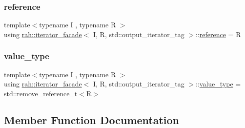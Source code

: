 \subsubsection{\texorpdfstring{reference}{reference}}
{\footnotesize\ttfamily template$<$typename I , typename R $>$ \\
using \mbox{\hyperlink{structrah_1_1iterator__facade}{rah\+::iterator\+\_\+facade}}$<$ I, R, std\+::output\+\_\+iterator\+\_\+tag $>$\+::\mbox{\hyperlink{structrah_1_1iterator__facade_3_01_i_00_01_r_00_01std_1_1output__iterator__tag_01_4_aa6a95e1b55444933973b7fe4a63512e2}{reference}} =  R}

\mbox{\label{structrah_1_1iterator__facade_3_01_i_00_01_r_00_01std_1_1output__iterator__tag_01_4_aeafcf4359545a589d72a23f8500e9b74}} 
\subsubsection{\texorpdfstring{value\_type}{value\_type}}
{\footnotesize\ttfamily template$<$typename I , typename R $>$ \\
using \mbox{\hyperlink{structrah_1_1iterator__facade}{rah\+::iterator\+\_\+facade}}$<$ I, R, std\+::output\+\_\+iterator\+\_\+tag $>$\+::\mbox{\hyperlink{structrah_1_1iterator__facade_3_01_i_00_01_r_00_01std_1_1output__iterator__tag_01_4_aeafcf4359545a589d72a23f8500e9b74}{value\+\_\+type}} =  std\+::remove\+\_\+reference\+\_\+t$<$R$>$}



\subsection{Member Function Documentation}
\mbox{\label{structrah_1_1iterator__facade_3_01_i_00_01_r_00_01std_1_1output__iterator__tag_01_4_a7c68323dc18e20b6f946223ee54d88c8}} 
